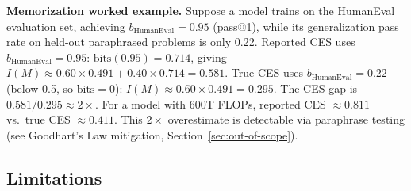 \documentclass[12pt]{article}
\begin{document}
\noindent\textbf{Memorization worked example.} Suppose a model trains on the HumanEval evaluation set, achieving $b_{\text{HumanEval}} = 0.95$ (pass@1), while its generalization pass rate on held-out paraphrased problems is only 0.22. Reported CES uses $b_{\text{HumanEval}} = 0.95$: $\text{bits}(0.95) = 0.714$, giving $I(M) \approx 0.60 \times 0.491 + 0.40 \times 0.714 = 0.581$. True CES uses $b_{\text{HumanEval}} = 0.22$ (below 0.5, so $\text{bits} = 0$): $I(M) \approx 0.60 \times 0.491 = 0.295$. The CES gap is $0.581/0.295 \approx 2\times$. For a model with 600T FLOPs, reported CES $\approx 0.811$ vs.\ true CES $\approx 0.411$. This $2\times$ overestimate is detectable via paraphrase testing (see Goodhart's Law mitigation, Section~\ref{sec:out-of-scope}).

\subsection{Limitations}
\end{document}

